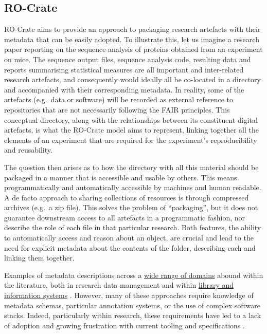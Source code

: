 {\hypertarget{rocrate}{%
\subsection{RO-Crate}\label{rocrate}}

RO-Crate aims to provide an approach to packaging research artefacts
with their metadata that can be easily adopted. To illustrate this, let
us imagine a research paper reporting on the sequence analysis of
proteins obtained from an experiment on mice. The sequence output files,
sequence analysis code, resulting data and reports summarising
statistical measures are all important and inter-related research
artefacts, and consequently would ideally all be co-located in a
directory and accompanied with their corresponding metadata. In reality,
some of the artefacts (e.g.~data or software) will be recorded as
external reference to repositories that are not necessarily following
the FAIR principles. This conceptual directory, along with the
relationships between its constituent digital artefacts, is what the
RO-Crate model aims to represent, linking together all the elements of
an experiment that are required for the experiment's reproducibility and
reusability.

The question then arises as to how the directory with all this material
should be packaged in a manner that is accessible and usable by others.
This means programmatically and automatically accessible by machines and
human readable. A de facto approach to sharing collections of resources
is through compressed archives (e.g.~a zip file). This solves the
problem of ``packaging'', but it does not guarantee downstream access to
all artefacts in a programmatic fashion, nor describe the role of each
file in that particular research. Both features, the ability to
automatically access and reason about an object, are crucial and lead to
the need for explicit metadata about the contents of the folder,
describing each and linking them together.

Examples of metadata descriptions across a
\href{https://rdamsc.bath.ac.uk/scheme-index}{wide range of domains}
abound within the literature, both in research data management
\cite{Amorim 2016}
\cite{ch5-46}
\cite{ch5-75} and within
\href{https://www.loc.gov/librarians/standards}{library and information
systems} \cite{Mai Chan 1995}
\cite{ch5-127}. However, many
of these approaches require knowledge of metadata schemas, particular
annotation systems, or the use of complex software stacks. Indeed,
particularly within research, these requirements have led to a lack of
adoption and growing frustration with current tooling and specifications
\cite{ch5-94}
\cite{ch5-119}
\cite{ch5-102}.

}
